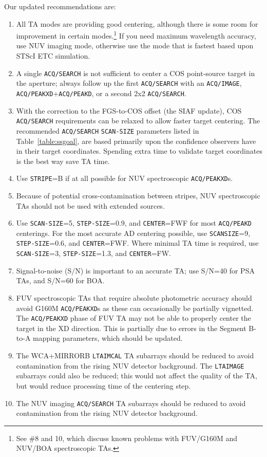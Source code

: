 \documentclass[12pt]{article}
\begin{document}
 Our updated recommendations are:
\begin{enumerate}
\item{All TA modes are providing good centering, although there is some room for improvement in certain modes.\footnote{See \#8 and 10, which discuss known problems with FUV/G160M and NUV/BOA spectroscopic TAs.}
If you need maximum wavelength accuracy, use NUV imaging mode,
otherwise use the mode that is fastest based upon STScI ETC simulation.}

\item{A single \texttt{ACQ/SEARCH} is not sufficient to center a COS point-source target in the aperture; always follow up the first \texttt{ACQ/SEARCH} with an \texttt{ACQ/IMAGE}, \texttt{ACQ/PEAKXD}+\texttt{ACQ/PEAKD}, or a second 2x2 \texttt{ACQ/SEARCH}.}

\item{With the correction to the FGS-to-COS offset (the SIAF update), COS \texttt{ACQ/SEARCH} requirements can be relaxed to allow faster target centering. The recommended \texttt{ACQ/SEARCH} \texttt{SCAN-SIZE} parameters listed in Table~\ref{table:ssgoal}, are based primarily upon the confidence observers have in their target coordinates.
Spending extra time to validate target coordinates is the best way save TA time.}

\item{Use \texttt{STRIPE}=B if at all possible for NUV spectroscopic \texttt{ACQ/PEAKXD}s.}
\item{Because of potential cross-contamination between stripes, NUV spectroscopic TAs should not be used with extended sources.}
\item{Use \texttt{SCAN-SIZE}=5, \texttt{STEP-SIZE}=0.9, and \texttt{CENTER}=FWF for most \texttt{ACQ/PEAKD} centerings.
For the most accurate AD centering possible, use \texttt{SCANSIZE}=9, \texttt{STEP-SIZE}=0.6, and \texttt{CENTER}=FWF.
Where minimal TA time is required, use \texttt{SCAN-SIZE}=3, \texttt{STEP-SIZE}=1.3, and \texttt{CENTER}=FW.}
\item{Signal-to-noise (S/N) is important to an accurate TA; use S/N=40 for PSA TAs, and S/N=60 for BOA.}
\item{FUV spectroscopic TAs that require absolute photometric accuracy should avoid G160M \texttt{ACQ/PEAKXD}s as these can occasionally be partially vignetted.
The \texttt{ACQ/PEAKXD} phase of FUV TA may not be able to properly center the target in the XD direction.
This is partially due to errors in the Segment B-to-A mapping parameters, which should be updated.}
\item{The WCA+MIRRORB \texttt{LTAIMCAL} TA subarrays should be reduced to avoid contamination from the rising NUV detector background. The \texttt{LTAIMAGE} subarrays could also be reduced; this would not affect the quality of the TA, but would reduce processing time of the centering step.\label{item:LTAIMCAL}}
\item{The NUV imaging \texttt{ACQ/SEARCH} TA subarrays should be reduced to avoid contamination from the rising NUV detector background.}


\end{enumerate}
\end{document}
